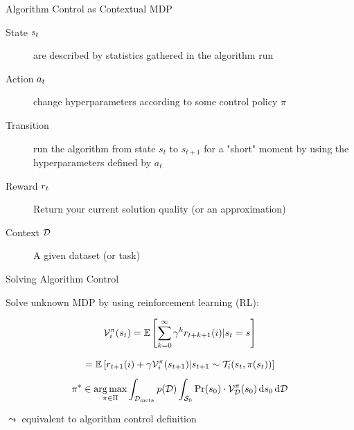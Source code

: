 \begin{frame}[c]{Algorithm Control as Contextual MDP }


\begin{description}
	\item[State $s_t$] are described by statistics gathered in the algorithm run
	\pause
	\item[Action $a_t$] change hyperparameters according to some control policy $\pi$
	\pause
	\item[Transition] run the algorithm from state $s_t$ to $s_{t+1}$ for a "short" moment by using the hyperparameters defined by $a_t$
	\pause
	\item[Reward $r_t$] Return your current solution quality (or an approximation)
	\pause
	\item[Context $\mathcal{D}$] A given dataset (or task)
\end{description}

\bigskip
	

	
	
\end{frame}
\begin{frame}[c]{Solving Algorithm Control}

Solve unknown MDP by using reinforcement learning (RL):

\begin{equation}
\mathcal{V}_i^\pi(s_t) =  \mathbb{E} \left[\sum_{k=0}^\infty\gamma^k r_{t+k+1}(i)| s_t=s \right]\nonumber
\end{equation}
\pause

\begin{equation}
 = \mathbb{E} \left[ r_{t+1}(i)+\gamma\mathcal{V}_i^\pi(s_{t+1})| s_{t+1} \sim \mathcal{T}_i(s_t, \pi(s_t)) \right] \nonumber
\end{equation}
\pause
\begin{equation}
\pi^* \in
\operatorname*{arg\,max}_{\pi \in \Pi}
\int_{\mathcal{D}_{\text{meta}}} p(\mathcal{D}) \int_{\mathcal{S}_0} \Pr(s_0) \cdot \mathcal{V}^\pi_{\mathcal{D}}(s_0) \mathop{}\!\mathrm{d} s_0 \mathop{}\!\mathrm{d} \mathcal{D} \nonumber
\end{equation}

\bigskip
$\leadsto$ equivalent to algorithm control definition


\end{frame}
